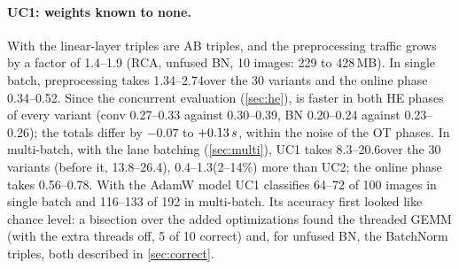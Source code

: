 \paragraph{UC1: weights known to none.} With  the linear-layer triples are AB triples, and the preprocessing traffic
grows by a factor of 1.4--1.9 (RCA, unfused BN, 10 images: 229 to 428\,MB). In single batch, preprocessing takes 1.34--2.74\s over the 30 variants and the online phase 0.34--0.52\s. Since the
concurrent evaluation (\cref{sec:he}),  is faster in both HE phases of every variant (conv 0.27--0.33 against
0.30--0.39\s, BN 0.20--0.24 against 0.23--0.26\s); the totals differ by $-0.07$ to $+0.13\,s$, within the noise of the
OT phases. In multi-batch, with the lane batching (\cref{sec:multi}), UC1 takes 8.3--20.6\s over the 30 variants
(before it, 13.8--26.4\s), 0.4--1.3\s (2--14\%) more than UC2; the online phase takes 0.56--0.78\s. With the
AdamW model UC1 classifies 64--72 of 100 images in single batch and 116--133 of 192 in multi-batch. Its accuracy first looked like
chance level: a bisection over the added optimizations found the threaded GEMM (with the extra threads off, 5 of 10 correct)
and, for unfused BN, the BatchNorm triples, both described in \cref{sec:correct}.
